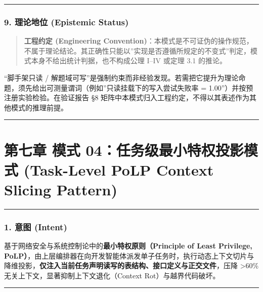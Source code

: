 \documentclass[
]{ctexart}
\renewcommand{\_}{\discretionary{}{}{\textunderscore}}
\let\oldsection\section
\renewcommand{\section}{\clearpage\oldsection}
\begin{document}
\begin{center}\rule{0.5\linewidth}{0.5pt}\end{center}

\subsubsection{9. 理论地位 (Epistemic
Status)}\label{ux7406ux8bbaux5730ux4f4d-epistemic-status}

\begin{quote}
\textbf{工程约定 (Engineering
Convention)}：本模式是不可证伪的操作规范，不属于理论结论。其正确性只能以''实现是否遵循所规定的不变式''判定，模式本身不给出统计判据，也不构成公理
I--IV 或定理 3.1 的推论。
\end{quote}

``脚手架只读 /
解题域可写''是强制约束而非经验发现。若需把它提升为理论命题，须先给出可测量谓词（例如''只读挂载下的写入尝试失败率
= 1.00''）并按预注册实验检验。在验证报告 §8
矩阵中本模式归入工程约定，不得以其表述作为其他模式的推理前提。

\begin{center}\rule{0.5\linewidth}{0.5pt}\end{center}

\section{第七章 模式 04：任务级最小特权投影模式 (Task-Level PoLP Context
Slicing
Pattern)}\label{ux6a21ux5f0f-04ux4efbux52a1ux7ea7ux6700ux5c0fux7279ux6743ux6295ux5f71ux6a21ux5f0f-task-level-polp-context-slicing-pattern}

\begin{center}\rule{0.5\linewidth}{0.5pt}\end{center}

\subsubsection{1. 意图 (Intent)}\label{ux610fux56fe-intent-3}

基于网络安全与系统控制论中的\textbf{最小特权原则（Principle of Least
Privilege,
PoLP）}，由上层编排器在向开发智能体派发单子任务时，执行动态上下文切片与降维投影，\textbf{仅注入当前任务声明读写的表结构、接口定义与正交文件}，压降
\textgreater60\% 无关上下文，显著抑制上下文退化（Context
Rot）与越界代码破坏。

\begin{center}\rule{0.5\linewidth}{0.5pt}\end{center}
\end{document}
